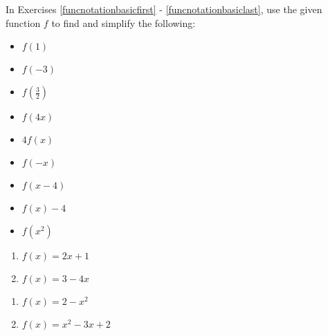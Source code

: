 In Exercises \ref{funcnotationbasicfirst} - \ref{funcnotationbasiclast}, use the given function $f$ to find and simplify the following:

\begin{multicols}{3}
\begin{itemize}
\item $f(1)$
\item $f(-3)$
\item $f\left(\frac{3}{2} \right)$
\end{itemize}
\end{multicols}

\begin{multicols}{3}
\begin{itemize}
\item  $f(4x)$
\item $4f(x)$
\item $f(-x)$
\end{itemize}
\end{multicols}

\begin{multicols}{3}
\begin{itemize}
\item  $f(x-4)$
\item $f(x) - 4$
\item  $f\left(x^2\right)$
\end{itemize}
\end{multicols}

\begin{multicols}{2}
\begin{enumerate}
\setcounter{enumi}{\value{HW}}

\item  $f(x) = 2x+1$ \label{funcnotationbasicfirst} 
\item  $f(x) = 3 - 4x$

\setcounter{HW}{\value{enumi}}
\end{enumerate}
\end{multicols}

\begin{multicols}{2}
\begin{enumerate}
\setcounter{enumi}{\value{HW}}

\item $f(x) = 2 - x^2$
\item $f(x) = x^2 - 3x + 2$

\setcounter{HW}{\value{enumi}}
\end{enumerate}
\end{multicols}

